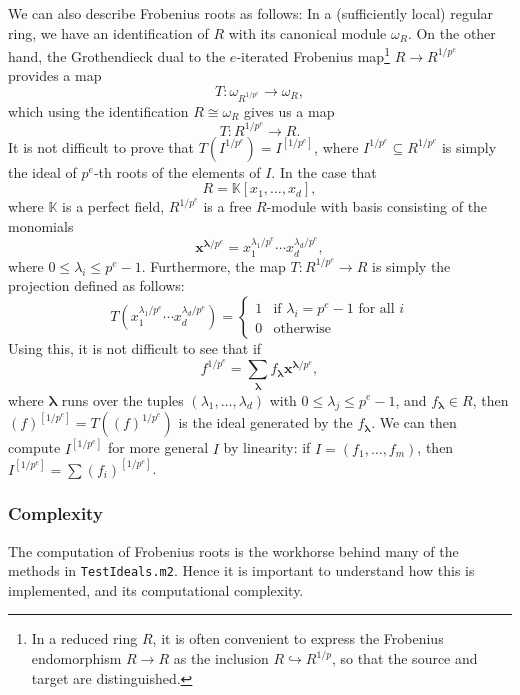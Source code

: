 \documentclass{amsart}
\renewcommand{\leq}{\leqslant}
\begin{document}
We can also describe Frobenius roots as follows:  In a (sufficiently local) regular ring, we have an identification of $R$ with its canonical module $\omega_R$.
On the other hand, the Grothendieck dual to the $e$-iterated Frobenius map\footnote{In a reduced ring $R$, it is often convenient to express the Frobenius endomorphism $R \to R$ as the inclusion $R \hookrightarrow R^{1/p}$, so that the source and target  are distinguished.} $R \to R^{1/p^e}$ provides a map
\begin{equation}
\label{eq.DualToFrobenius}
T : \omega_{R^{1/p^e}} \to \omega_R,
\end{equation}
which using the identification $R \cong \omega_R$ gives us a map
\[
T : R^{1/p^e} \to R.
\]
It is not difficult to prove that
$T(I^{1/p^e})=I^{[1/p^e]}$,
where $I^{1/p^e} \subseteq R^{1/p^e}$ is simply the ideal of $p^e$-th roots of the elements of $I$.
In the case that
\[
R = \mathbb{K}[x_1, \ldots, x_d],
\]
where $\mathbb{K}$ is a perfect field,
$R^{1/p^e}$ is a free $R$-module with basis consisting of the monomials
\[
\mathbf{x}^{\boldsymbol{\lambda}/p^e}= x_1^{\lambda_1/p^e} \cdots x_d^{\lambda_d/p^e},
\]
where $0 \leq \lambda_i \leq p^e-1$.
Furthermore, the map $T : R^{1/p^e} \to R$ is simply the projection defined as follows:
\[
T(x_1^{\lambda_1/p^e} \cdots x_d^{\lambda_d/p^e}) = \left\{ \begin{array}{rl} 1 &\text{if } \lambda_i = p^{e}-1 \text{ for all }i \\ 0 & \text{otherwise}  \end{array} \right.
\]
Using this, it is not difficult to see that if
\begin{equation}
\label{eqn1}
f^{1/p^e} = \sum_{\boldsymbol{\lambda}} f_{\boldsymbol{\lambda}} \mathbf{x}^{\boldsymbol{\lambda} / p^e},
\end{equation}
where $\boldsymbol{\lambda}$ runs over the tuples $(\lambda_1, \dots, \lambda_d)$ with $0 \leq \lambda_j \leq p^e-1$, and $f_{\boldsymbol{\lambda}} \in R$, then
$(f)^{[1/p^e]} = T( (f)^{1/p^e})$ is the ideal generated by the $f_{\boldsymbol{\lambda}}$.
We can then compute $I^{[1/p^e]}$ for more general $I$ by linearity: if $I=(f_1,\ldots,f_m)$, then $I^{[1/p^e]}= \sum(f_i)^{[1/p^e]}$.

\subsubsection{Complexity}
The computation of Frobenius roots is the workhorse behind many of the methods in \texttt{TestIdeals.m2}.
Hence it is important to understand how this is implemented, and its computational complexity.
\end{document}

